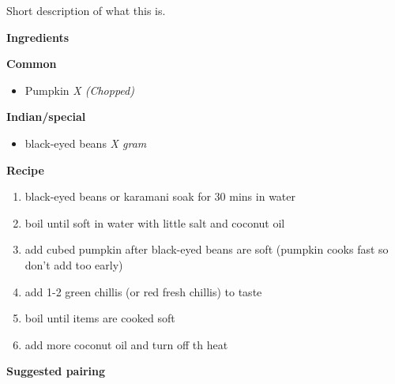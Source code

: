 Short description of what this is.

\large{\textbf{Ingredients}}
\begin{multicols}{2}
  \large{\textbf{Common}}
  \begin{itemize}
    \item Pumpkin \hfill \textit{X (Chopped)}
  \end{itemize}
  \columnbreak
  \large{\textbf{Indian/special}}
  \begin{itemize}
    \item black-eyed beans \hfill \textit{X gram}
  \end{itemize}
\end{multicols}

\large{\textbf{Recipe}}

\begin{enumerate}
  \item black-eyed beans or karamani soak for 30 mins in water
  \item boil until soft in water with little salt and coconut oil
  \item add cubed pumpkin after black-eyed beans are soft (pumpkin cooks fast so don't add too early)
  \item add 1-2 green chillis (or red fresh chillis) to taste
  \item boil until items are cooked soft
  \item add more coconut oil and turn off th heat
\end{enumerate}

\large{\textbf{Suggested pairing}}
